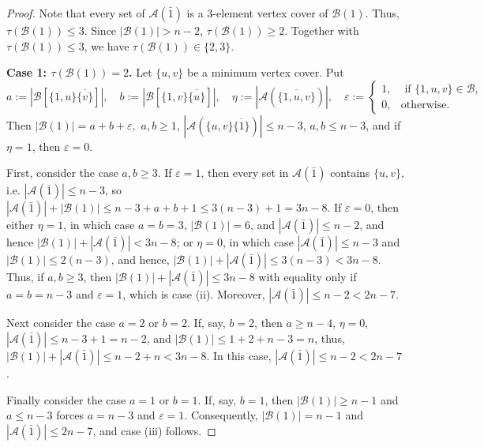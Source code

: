 \documentclass[10pt,a4paper]{amsart}
\newcommand{\m}{\mathcal}
\begin{document}
\begin{proof}
Note that
every set of $\m A(\bar 1)$ is a $3$-element vertex cover of
$\m B(1)$. Thus, $\tau(\m B(1))\le 3$.
Since $|\m B(1)|>n-2$, $\tau(\m B(1))\ge 2$. Together with $\tau(\m B(1))\le3$, we have $\tau(\m B(1))\in\{2,3\}.$ 

{\bf Case 1: $\tau(\m B(1))=2$. }
Let $\{u,v\}$ be a minimum vertex
cover. Put 
\[
a:=|\m B[\{1,u\}\overline{\{v\}}]|,
\quad
b:=|\m B[\{1,v\}\overline{\{u\}}]|,
\quad
\eta:=|\m A(\overline{\{1,u,v\}})|,
\quad
\varepsilon:=
\begin{cases}
1,& \text{ if } \{1,u,v\}\in \m B,\\
0,& \text{otherwise}.
\end{cases}
\]
Then $|\m B(1)|=a+b+\varepsilon,$ $a,b\ge1$, $|\m A(\{u,v\}\overline{\{1\}})|\le n-3$, $a,b \le n-3$,
and if $\eta=1$, then $\varepsilon=0$.

First, consider the case $a,b\ge3$. If $\varepsilon=1$, then every set in $\m A(\bar1)$ contains $\{u,v\}$, i.e. $|\m A(\bar1)|\le {n-3}$, so $|\m A(\bar1)|+|\m B(1)|\le {n-3}+a+b+1\le 3(n-3)+1=3n-8$.
If $\varepsilon=0$, then either $\eta=1$, in which case $a=b=3$, $|\m B(1)|=6$, and $|\m A(\bar1)|\le n-2$, and hence $|\m B(1)|+|\m A(\bar1)|<3n-8$; or $\eta=0$, in which case 
$|\m A(\bar1)|\le n-3$ and $|\m B(1)|\le 2(n-3)$, and hence, 
$|\m B(1)|+|\m A(\bar1)|\le 3(n-3)<3n-8$. Thus, if $a,b\ge3$, then $|\m B(1)|+|\m A(\bar1)|\le 3n-8$ with equality only if $a=b=n-3$ and $\varepsilon=1$, which is case \rm(ii). Moreover, $|\m A(\bar1)|\le n-2<2n-7$. 

Next consider the case $a=2$ or $b=2$. If, say, $b=2$, then $a\ge n-4$, $\eta=0$, $|\m A(\bar1)|\le n-3+1=n-2$, and $|\m B(1)|\le 1+2+n-3=n$, thus,
$|\m B(1)|+|\m A(\bar1)|\le n-2+n<3n-8$. In this case, $|\m A(\bar1)|\le n-2<2n-7$. 

Finally consider the case $a=1$ or $b=1$. If, say, $b=1$, then $|\m B(1)|\ge n-1$ and  $a\le n-3$ forces $a= n-3$ and $\varepsilon=1$. 
Consequently, $|\m B(1)|= n-1$ and $|\m A(\bar1)|\le 2n-7$,
and case \rm(iii) follows. 


\end{proof}
\end{document}
